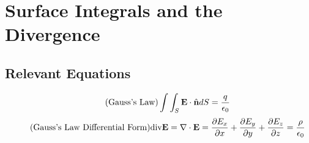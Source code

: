\documentclass{article}
\begin{document}
\section{Surface Integrals and the Divergence}
\subsection*{Relevant Equations}
    \begin{equation}\tag{Gauss's Law}
        \int\int_S \textbf{E} \cdot \hat{\textbf{n}} dS = \frac{q}{\epsilon_0}
    \end{equation}
    \begin{equation}\tag{Gauss's Law Differential Form}
        \textnormal{div} \textbf{E} = \nabla \cdot \textbf{E} = \frac{\partial{E_x}}{\partial{x}} + \frac{\partial{E_y}}{\partial{y}} + \frac{\partial{E_z}}{\partial{z}} = \frac{\rho}{\epsilon_0}
    \end{equation}
\end{document}
